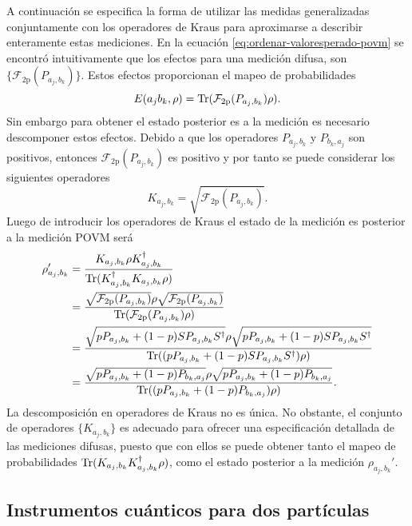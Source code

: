 A continuación se especifica la forma de utilizar las medidas generalizadas conjuntamente con los operadores de Kraus para aproximarse a describir enteramente estas mediciones. En la ecuación {\eqref{eq:ordenar-valoresperado-povm}} se encontró intuitivamente que los efectos para una medición difusa, son $\{\mathcal{F}_{2\text{p}}({P_{a_j,b_k}})\}$. Estos efectos proporcionan el mapeo de probabilidades\begin{equation}\label{eq:mapeo-probabilidades-2p}
    E(a_j b_k, \rho)= {\rm Tr}(\mathcal{F}_{2\text{p}}({P_{a_j,b_k}})\rho).
    \end{equation} Sin embargo para obtener el estado posterior es a la medición es necesario descomponer estos efectos. Debido a que los operadores $P_{a_j,b_k }$ y $P_{b_k,a_j}$ son  positivos, entonces  $\mathcal{F}_{2\text{p}}({P_{a_j,b_k}})$ es positivo y por tanto se puede considerar los siguientes operadores\[K_{a_j,b_k}=\sqrt{\mathcal{F}_{2\text{p}}({P_{a_j,b_k}})}.\] Luego de introducir los operadores de Kraus el
    estado de la medición es posterior a la medición POVM será
    \begin{equation}\label{eq:estado-posterior-povm1-2p}\begin{split}\rho'_{a_j,b_k}&=\dfrac{K_{a_j,b_k} \rho
    K_{a_j,b_k}^\dagger}{{\rm Tr}(K_{a_j,b_k}^\dagger K_{a_j,b_k} \rho)}\\
    &=\dfrac{\sqrt{\mathcal{F}_{2\text{p}}(P_{a_j,b_k})} \rho
    \sqrt{\mathcal{F}_{2\text{p}}({P_{a_j,b_k}})}}{{\rm Tr}(\mathcal{F}_{2\text{p}}({P_{a_j,b_k}}) \rho)}\\
    &=\dfrac{\sqrt{p P_{a_j,b_k}+(1-p)SP_{a_j,b_k}S^\dagger}\rho\sqrt{p P_{a_j,b_k}+(1-p)SP_{a_j,b_k}S^\dagger}}{{\rm Tr}((p P_{a_j,b_k}+(1-p)SP_{a_j,b_k}S^\dagger) \rho)}\\
    &=\dfrac{\sqrt{p P_{a_j,b_k}+(1-p)P_{b_k,a_j}}\rho\sqrt{p P_{a_j,b_k}+(1-p)P_{b_k,a_j}} }{{\rm Tr}((p P_{a_j,b_k}+(1-p)P_{b_k,a_j}) \rho)}.
    \end{split}\end{equation}La descomposición en operadores de Kraus
    no es única. No obstante, el conjunto de operadores $\{K_{a_j,b_k}\}$ es adecuado para ofrecer una especificación detallada de las mediciones difusas, puesto que con ellos se puede obtener tanto el mapeo de probabilidades ${\rm Tr}(K_{a_j,b_k}K_{a_j,b_k}^\dagger \rho)$, como el estado posterior a la medición $\rho_{a_j,b_k}'$.



\subsection{Instrumentos cuánticos para dos partículas} %

